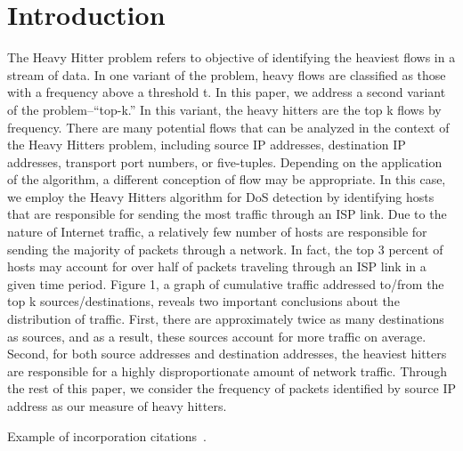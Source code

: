 \section{Introduction}
\label{sec:intro}
The Heavy Hitter problem refers to objective of identifying the heaviest flows in a stream of data. In one variant of the problem, heavy flows are classified as those with a frequency above a threshold t. In this paper, we address a second variant of the problem--``top-k.'' In this variant, the heavy hitters are the top k flows by frequency. 
There are many potential flows that can be analyzed in the context of the Heavy Hitters problem, including source IP addresses, destination IP addresses, transport port numbers, or five-tuples. Depending on the application of the algorithm, a different conception of flow may be appropriate. In this case, we employ the Heavy Hitters algorithm for DoS detection by identifying hosts that are responsible for sending the most traffic through an ISP link. Due to the nature of Internet traffic, a relatively few number of hosts are responsible for sending the majority of packets through a network. In fact, the top 3 percent of hosts may account for over half of packets traveling through an ISP link in a given time period. Figure 1, a graph of cumulative traffic addressed to/from the top k sources/destinations, reveals two important conclusions about the distribution of traffic. First, there are approximately twice as many destinations as sources, and as a result, these sources account for more traffic on average. Second, for both source addresses and destination addresses, the heaviest hitters are responsible for a highly disproportionate amount of network traffic. Through the rest of this paper, we consider the frequency of packets identified by source IP address as our measure of heavy hitters.

Example of incorporation citations~\cite{coral:nsdi04}.

